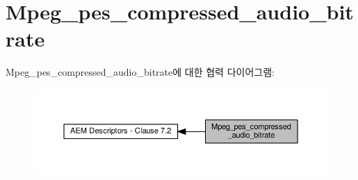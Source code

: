 \hypertarget{group__mpeg__pes__compressed__audio__bitrate}{}\section{Mpeg\+\_\+pes\+\_\+compressed\+\_\+audio\+\_\+bitrate}
\label{group__mpeg__pes__compressed__audio__bitrate}
Mpeg\+\_\+pes\+\_\+compressed\+\_\+audio\+\_\+bitrate에 대한 협력 다이어그램\+:
\nopagebreak
\begin{figure}[H]
\begin{center}
\leavevmode
\includegraphics[width=350pt]{group__mpeg__pes__compressed__audio__bitrate}
\end{center}
\end{figure}
